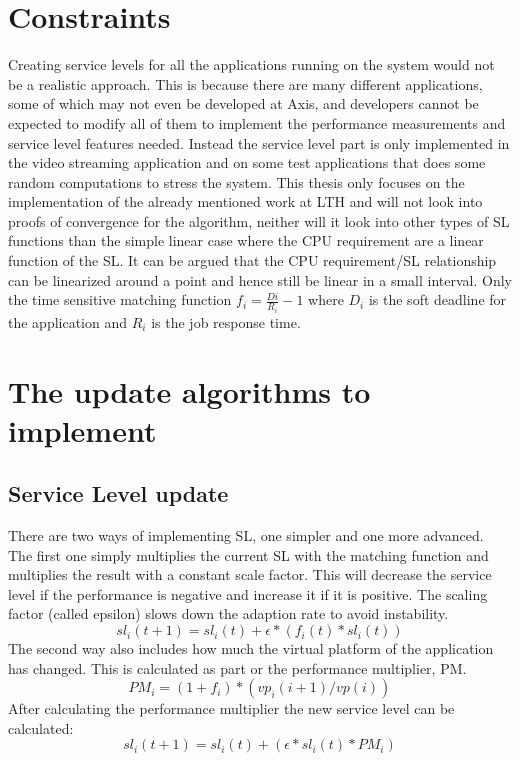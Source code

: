 \documentclass[nobiblatex]{LTHthesis}
\begin{document}
\section{Constraints} %
Creating service levels for all the applications running on the system would not be a realistic approach. This is because there are many different applications, some of which may not even be developed at Axis, and developers cannot be expected to modify all of them to implement the performance measurements and service level features needed. Instead the service level part is only implemented in the video streaming application and on some test applications that does some random computations to stress the system. This thesis only focuses on the implementation of the already mentioned work at LTH and will not look into proofs of convergence for the algorithm, neither will it look into other types of SL functions than the simple linear case where the CPU requirement are a linear function of the SL. It can be argued that the CPU requirement/SL relationship can be linearized around a point and hence still be linear in a small interval. Only the time sensitive matching function $f_{i}=\frac{D{i}}{R_{i}}-1$ where $D_{i}$ is the soft deadline for the application and $R_{i}$ is the job response time.







\section{The update algorithms to implement}


\subsection{Service Level update}
There are two ways of implementing SL, one simpler and one more advanced. The first one simply multiplies the current SL with the matching function and multiplies the result with a constant scale factor. This will decrease the service level if the performance is negative and increase it if it is positive. The scaling factor (called epsilon) slows down the adaption rate to avoid instability. 
\[sl_i(t+1)= sl_i(t) + \epsilon*(f_i(t)*sl_i(t)) \]
The second way also includes how much the virtual platform of the application has changed. This is calculated as part or the performance multiplier, PM.
\[PM_i = (1+f_i)*(vp_i(i+1)/vp(i))\]
After calculating the performance multiplier the new service level can be calculated:
\[sl_i(t+1)=sl_i(t) + (\epsilon*sl_i(t)*PM_i)\]
\end{document}
